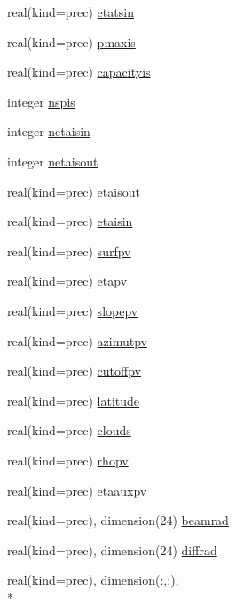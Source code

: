 \begin{DoxyCompactItemize}
\item 
real(kind=prec) \hyperlink{classinputvar_ad3f2c5423c51b51ac0cc6460154eab83}{etatsin}
\item 
real(kind=prec) \hyperlink{classinputvar_a75e1360d9c427fd4f7270abee815328b}{pmaxis}
\item 
real(kind=prec) \hyperlink{classinputvar_af73bb61794a02bc78ab1b1d648ce0c3d}{capacityis}
\item 
integer \hyperlink{classinputvar_ae189f83f0afe8df98cf88452173c782e}{nspis}
\item 
integer \hyperlink{classinputvar_a63a512514b3a4b5201f10f361e8f4fd6}{netaisin}
\item 
integer \hyperlink{classinputvar_a086fbbc0efe6f9f755aa90487c13c346}{netaisout}
\item 
real(kind=prec) \hyperlink{classinputvar_a983863d38cd184ba902b7f39e80ebb36}{etaisout}
\item 
real(kind=prec) \hyperlink{classinputvar_ab16e97e62c61ca357fdb5a6ef4d54433}{etaisin}
\item 
real(kind=prec) \hyperlink{classinputvar_a96c41574bce3d9f6f6493a87e1a5147e}{surfpv}
\item 
real(kind=prec) \hyperlink{classinputvar_abd526b84db5033c573303c7859b28963}{etapv}
\item 
real(kind=prec) \hyperlink{classinputvar_a14912f73e74d3dedf580804ab63fd57f}{slopepv}
\item 
real(kind=prec) \hyperlink{classinputvar_ae36a6ce527f47c090cf19f733d28b6d7}{azimutpv}
\item 
real(kind=prec) \hyperlink{classinputvar_ab8f560a60d07ea2ec86b99b42e799877}{cutoffpv}
\item 
real(kind=prec) \hyperlink{classinputvar_aa7a4772c1f679371a4578409bd0e48c5}{latitude}
\item 
real(kind=prec) \hyperlink{classinputvar_a20445ed085b01d2d9787297ac8390cd8}{clouds}
\item 
real(kind=prec) \hyperlink{classinputvar_a912165017f8566044a451c888ab58c60}{rhopv}
\item 
real(kind=prec) \hyperlink{classinputvar_aeb72fc2d7eca7ba95a0fd6dbb0238cf0}{etaauxpv}
\item 
real(kind=prec), dimension(24) \hyperlink{classinputvar_a32edbf52e3022964fd59a2a4d76a6b6d}{beamrad}
\item 
real(kind=prec), dimension(24) \hyperlink{classinputvar_a29749af38c4932d37115166f23b769a3}{diffrad}
\item 
real(kind=prec), dimension(\-:,\-:), \\*

\end{DoxyCompactItemize}
